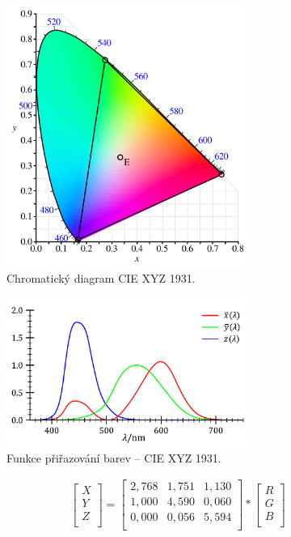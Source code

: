 \documentclass[a4paper, 12pt, titlepage]{article}
\begin{document}
  \begin{figure}[h!]
	\centering
	\includegraphics[width=8cm]{CIE1931xy_CIERGB.pdf}
	\caption{Chromatický diagram CIE XYZ 1931.}
	\label{fig:chroma_XYZ_1931}
	\end{figure}

  \begin{figure}[h!]
	\centering
	\includegraphics[width=8cm]{CIE_1931_XYZ_Color_Matching_Functions.pdf}
	\caption{Funkce přiřazování barev -- CIE XYZ 1931.}
	\label{fig:CIE_1931_XYZ_Color_Matching_Functions}
	\end{figure}

  \begin{align}
    \begin{bmatrix}
      X\\
      Y\\
      Z\\
    \end{bmatrix}
    =
    \begin{bmatrix}
      2,768 & 1,751 & 1,130\\
      1,000 & 4,590 & 0,060\\
      0,000 & 0,056 & 5,594\\
    \end{bmatrix}
    *
    \begin{bmatrix}
      R\\
      G\\
      B\\
    \end{bmatrix}
    \label{eq:rgb2xyz}
  \end{align}
\end{document}
